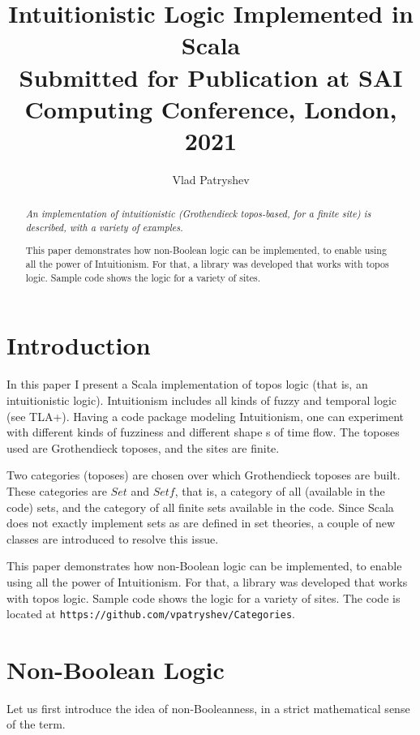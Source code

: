 \documentclass[10pt]{asme2ej}
\title{Intuitionistic Logic Implemented in Scala\\
Submitted for Publication at SAI Computing Conference, London, 2021}
\author{Vlad Patryshev}
\begin{document}
\UseRawInputEncoding

\maketitle    

\begin{abstract}
{\it 
An implementation of intuitionistic (Grothendieck topos-based, for a finite site) is described, with a variety of examples. 

This paper demonstrates how non-Boolean logic can be implemented, to enable using all the power of Intuitionism. For that, a library was developed that works with topos logic. Sample code shows the logic for a variety of sites. 
}
\end{abstract}

\section{Introduction}

 In this paper I present a Scala implementation of topos logic (that is, an intuitionistic logic). Intuitionism includes all kinds of fuzzy and temporal logic (see TLA+). Having a code package modeling Intuitionism, one can experiment with different kinds of fuzziness and different shape s of time flow. The toposes used are Grothendieck toposes, and the sites are finite. 
 
 Two categories (toposes) are chosen over which Grothendieck toposes are built. These categories are $Set$ and $Setf$, that is, a category of all (available in the code) sets, and the category of all finite sets available in the code. Since Scala does not exactly implement sets as are defined in set theories, a couple of new classes are introduced to resolve this issue.

This paper demonstrates how non-Boolean logic can be implemented, to enable using all the power of Intuitionism. For that, a library was developed that works with topos logic. Sample code shows the logic for a variety of sites.
The code is located at 
\verb+https://github.com/vpatryshev/Categories+.

\section{Non-Boolean Logic}
Let us first introduce the idea of non-Booleanness, in a strict mathematical sense of the term. 
\end{document}

